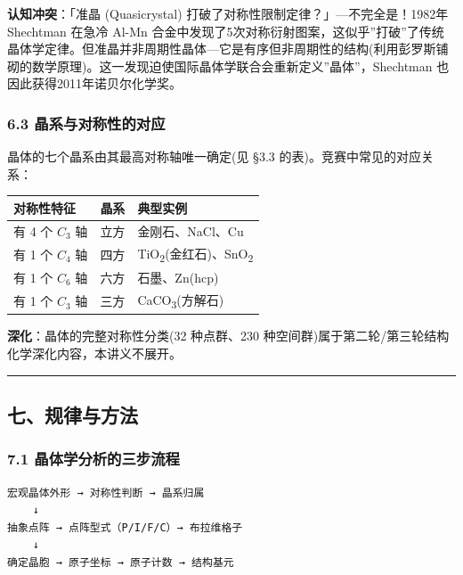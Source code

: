\textbf{认知冲突}：「准晶 (Quasicrystal) 打破了对称性限制定律？」---不完全是！1982年 Shechtman 在急冷 Al-Mn 合金中发现了5次对称衍射图案，这似乎''打破''了传统晶体学定律。但准晶并非周期性晶体---它是有序但非周期性的结构(利用彭罗斯铺砌的数学原理)。这一发现迫使国际晶体学联合会重新定义''晶体''，Shechtman 也因此获得2011年诺贝尔化学奖。

\subsubsection{6.3 晶系与对称性的对应}\label{ux6676ux7cfbux4e0eux5bf9ux79f0ux6027ux7684ux5bf9ux5e94}

晶体的七个晶系由其最高对称轴唯一确定(见 §3.3 的表)。竞赛中常见的对应关系：

{\def\LTcaptype{none} %
\begin{longtable}[]{@{}lcl@{}}
\toprule\noalign{}
对称性特征 & 晶系 & 典型实例 \\
\midrule\noalign{}
\endhead
\bottomrule\noalign{}
\endlastfoot
有 4 个 \(C_3\) 轴 & 立方 & 金刚石、NaCl、Cu \\
有 1 个 \(C_4\) 轴 & 四方 & TiO\textsubscript{2}(金红石)、SnO\textsubscript{2} \\
有 1 个 \(C_6\) 轴 & 六方 & 石墨、Zn(hcp) \\
有 1 个 \(C_3\) 轴 & 三方 & CaCO\textsubscript{3}(方解石) \\
\end{longtable}
}

\textbf{深化}：晶体的完整对称性分类(32 种点群、230 种空间群)属于第二轮/第三轮结构化学深化内容，本讲义不展开。

\begin{center}\rule{0.5\linewidth}{0.5pt}\end{center}

\subsection{七、规律与方法}\label{ux4e03ux89c4ux5f8bux4e0eux65b9ux6cd5}

\subsubsection{7.1 晶体学分析的三步流程}\label{ux6676ux4f53ux5b66ux5206ux6790ux7684ux4e09ux6b65ux6d41ux7a0b}

\begin{verbatim}
宏观晶体外形 → 对称性判断 → 晶系归属
    ↓
抽象点阵 → 点阵型式（P/I/F/C）→ 布拉维格子
    ↓
确定晶胞 → 原子坐标 → 原子计数 → 结构基元
\end{verbatim}

